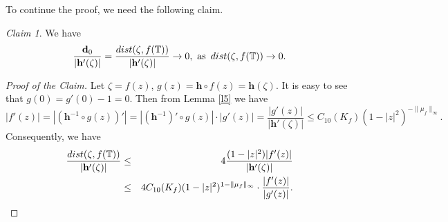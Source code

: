 \documentclass[11pt]{amsart}
\theoremstyle{remark}
\theoremstyle{claim}
\newtheorem{claim}[theorem]{Claim}
\theoremstyle{definition}
\theoremstyle{problem}
\theoremstyle{conjecture}
\theoremstyle{question}
\numberwithin{equation}{section}
\begin{document}
To continue the proof, we need the following claim.
\begin{claim}
We have
\begin{equation}\label{cla-00}
\frac{\mathbf{d}_0}{|{\mathbf{h}}'(\zeta)|}=\frac{{\textup{dist}}(\zeta, f(\mathbb{T}))}{|{\mathbf{h}}'(\zeta)|} \rightarrow 0, \,\, {\text {as}}\,\,\,  {\textup{dist}}(\zeta, f(\mathbb{T})) \rightarrow 0.
\end{equation}
\end{claim}

\begin{proof}[Proof of the Claim]
Let $\zeta=f(z)$, $g(z)=\mathbf{h}\circ f(z)={\mathbf{h}}(\zeta)$. It is easy to see that $g(0)=g'(0)-1=0$. Then from Lemma \ref{l5} we have
\begin{equation}
|f'(z)|=|({\mathbf{h}}^{-1} \circ g(z))'|=|({\mathbf{h}}^{-1})'\circ g(z)|\cdot |g'(z)|=\frac{|g'(z)|}{|{\mathbf{h}}'(\zeta)|}\leq C_{10}(K_f)(1-|z|^2)^{-\|\mu_{f}\|_{\infty}}.  \nonumber
\end{equation}
Consequently, we have
\begin{eqnarray}\label{cla-0}
\frac{{\textup{dist}}(\zeta, f(\mathbb{T}))}{|{\mathbf{h}}'(\zeta)|} &\leq & 4 \frac{(1-|z|^2)|f'(z)|}{|{\mathbf{h}}'(\zeta)|} \\
& \leq &  4C_{10}(K_f) (1-|z|^2)^{1-\|\mu_f\|_{\infty}} \cdot \frac{|f'(z)|}{|g'(z)|}.\nonumber
\end{eqnarray}


\end{proof}
\end{document}
